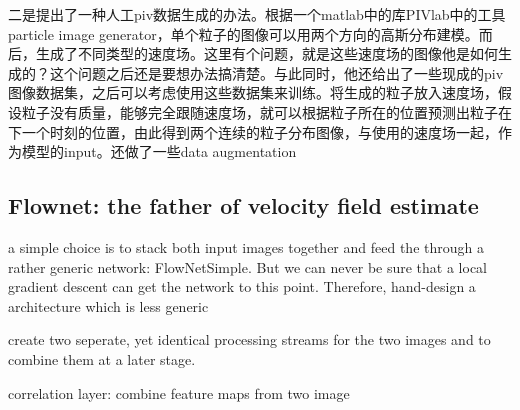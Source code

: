 \documentclass[UTF8]{ctexart}
\begin{document}
二是提出了一种人工piv数据生成的办法。根据一个matlab中的库PIVlab中的工具particle image generator，单个粒子的图像可以用两个方向的高斯分布建模。而后，生成了不同类型的速度场。这里有个问题，就是这些速度场的图像他是如何生成的？这个问题之后还是要想办法搞清楚。与此同时，他还给出了一些现成的piv图像数据集，之后可以考虑使用这些数据集来训练。将生成的粒子放入速度场，假设粒子没有质量，能够完全跟随速度场，就可以根据粒子所在的位置预测出粒子在下一个时刻的位置，由此得到两个连续的粒子分布图像，与使用的速度场一起，作为模型的input。还做了一些data augmentation


\subsection{Flownet: the father of velocity field estimate}

a simple choice is to stack both input images together and feed the through a rather generic network: FlowNetSimple.
But we can never be sure that a local gradient descent can get the network to this point.
Therefore, hand-design a architecture which is less generic

create two seperate, yet identical processing streams for the two images and to combine them at a later stage.

correlation layer: combine feature maps from two image



\end{document}
